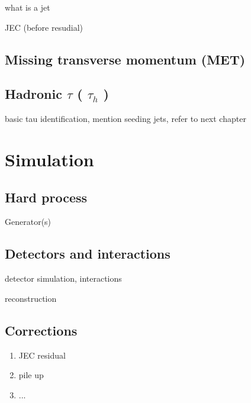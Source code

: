 what is a jet

JEC (before resudial)

\subsection{Missing transverse momentum (MET)}

\subsection{Hadronic $\tau$ ( $\tau_{h}$ )}

basic tau identification, mention seeding jets, refer to next chapter

\section{Simulation}

\subsection{Hard process} 

Generator(s)

\subsection{Detectors and interactions}

detector simulation, interactions

reconstruction

\subsection{Corrections}

\begin{enumerate}
\item JEC residual
\item pile up
\item ...
\end{enumerate}